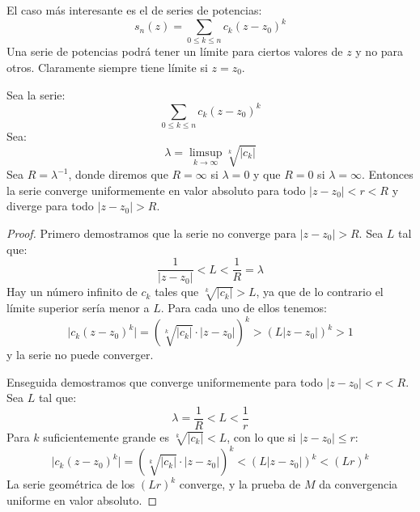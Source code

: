   El caso más interesante es el de series de potencias:
  \begin{equation*}
    s_n(z)
      = \sum_{0 \le k \le n} c_k (z - z_0)^k
  \end{equation*}
  Una serie de potencias
  podrá tener un límite para ciertos valores de \(z\)
  y no para otros.
  Claramente siempre tiene límite si \(z = z_0\).
  \begin{theorem}
    \label{theo:convergence-root}
    Sea la serie:
    \begin{equation*}
      \sum_{0 \le k \le n} c_k (z - z_0)^k
    \end{equation*}
    Sea:
    \begin{equation}
      \label{eq:convergence-radius-root}
      \lambda
	= \limsup_{k \rightarrow \infty} \sqrt[k]{\lvert c_k \rvert}
    \end{equation}
    Sea \(R = \lambda^{-1}\),
    donde diremos que \(R = \infty\) si \(\lambda = 0\)
    y que \(R = 0\) si \(\lambda = \infty\).
    Entonces la serie converge uniformemente en valor absoluto
    para todo \(\lvert z - z_0 \rvert < r < R\)
    y diverge para todo \(\lvert z - z_0 \rvert > R\).
  \end{theorem}
  \begin{proof}
    Primero demostramos que la serie no converge
    para \(\lvert z - z_0 \rvert > R\).
    Sea \(L\) tal que:
    \begin{equation*}
      \frac{1}{\lvert z - z_0 \rvert}
	< L
	< \frac{1}{R}
	= \lambda
    \end{equation*}
    Hay un número infinito de \(c_k\)
    tales que \(\sqrt[k]{\lvert c_k \rvert} > L\),
    ya que de lo contrario el límite superior sería menor a \(L\).
    Para cada uno de ellos tenemos:
    \begin{equation*}
      \lvert c_k (z - z_0)^k \rvert
	= \left(
	    \sqrt[k]{\lvert c_k \rvert} \cdot \lvert z - z_0 \rvert
	  \right)^k
	> \left( L \lvert z - z_0 \rvert \right)^k
	> 1
    \end{equation*}
    y la serie no puede converger.

    Enseguida demostramos que converge uniformemente
    para todo \(\lvert z - z_0 \rvert < r < R\).
    Sea \(L\) tal que:
    \begin{equation*}
      \lambda
	= \frac{1}{R}
	< L
	< \frac{1}{r}
    \end{equation*}
    Para \(k\) suficientemente grande
    es \(\sqrt[k]{\lvert c_k \rvert} < L\),
    con lo que si \(\lvert z - z_0 \rvert \le r\):
    \begin{equation*}
      \lvert c_k (z - z_0)^k \rvert
	= \left(
	    \sqrt[k]{\lvert c_k \rvert} \cdot \lvert z - z_0 \rvert
	  \right)^k
	< (L \lvert z - z_0 \rvert)^k
	< (L r)^k
    \end{equation*}
    La serie geométrica de los \((L r)^k\) converge,
    y la prueba de \(M\) da convergencia uniforme en valor absoluto.
  \end{proof}
